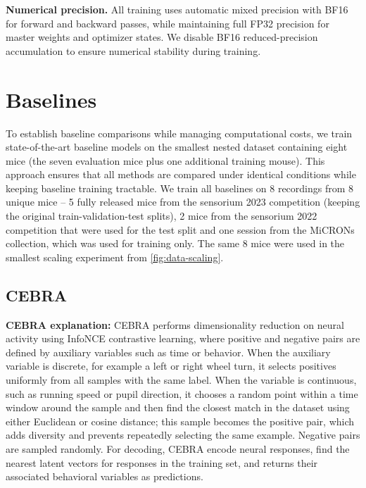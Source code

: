 \documentclass{article} %
\begin{document}
\textbf{Numerical precision.}
All training uses automatic mixed precision with BF16 for forward and backward passes, while maintaining full FP32 precision for master weights and optimizer states. We disable BF16 reduced-precision accumulation to ensure numerical stability during training.

\newpage 

\section{Baselines}
\label{sec:baselines-appendix}
To establish baseline comparisons while managing computational costs, we train state-of-the-art baseline models on the smallest nested dataset containing eight mice (the seven evaluation mice plus one additional training mouse). This approach ensures that all methods are compared under identical conditions while keeping baseline training tractable. 
We train all baselines on 8 recordings from 8 unique mice -- 5 fully released mice from the sensorium 2023 competition (keeping the original train-validation-test splits), 2 mice from the sensorium 2022 competition that were used for the test split and one session from the MiCRONs collection, which was used for training only.
The same 8 mice were used in the smallest scaling experiment from \cref{fig:data-scaling}.

\subsection{CEBRA}
\textbf{CEBRA explanation:}
CEBRA performs dimensionality reduction on neural activity using InfoNCE contrastive learning, where positive and negative pairs are defined by auxiliary variables such as time or behavior. 
When the auxiliary variable is discrete, for example a left or right wheel turn, it selects positives uniformly from all samples with the same label. 
When the variable is continuous, such as running speed or pupil direction, it chooses a random point within a time window around the sample and then find the closest match in the dataset using either Euclidean or cosine distance; this sample becomes the positive pair, which adds diversity and prevents repeatedly selecting the same example. 
Negative pairs are sampled randomly. 
For decoding, CEBRA encode neural responses, find the nearest latent vectors for responses in the training set, and returns their associated behavioral variables as predictions.
\end{document}
